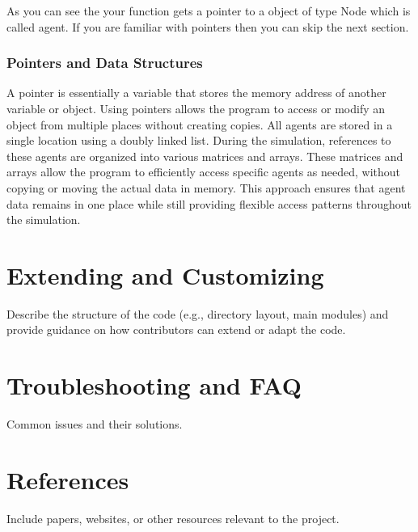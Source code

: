 \documentclass[11pt,a4paper]{article}
\begin{document}
    As you can see the your function gets a pointer to a object of type Node which is called agent. If you are familiar with pointers then you can skip the next section.

\subsubsection{Pointers and Data Structures}


A pointer is essentially a variable that stores the memory address of another variable or object. 
Using pointers allows the program to access or modify an object from multiple places without creating copies. All agents are stored in a single location using a doubly linked list. During the simulation, references to these agents are organized into various matrices and arrays. These matrices and arrays allow the program to efficiently access specific agents as needed, without copying or moving the actual data in memory. This approach ensures that agent data remains in one place while still providing flexible access patterns throughout the simulation.




\section{Extending and Customizing}
Describe the structure of the code (e.g., directory layout, main modules) and provide guidance on how contributors can extend or adapt the code.

\section{Troubleshooting and FAQ}
Common issues and their solutions.

\section{References}
Include papers, websites, or other resources relevant to the project.
\end{document}
